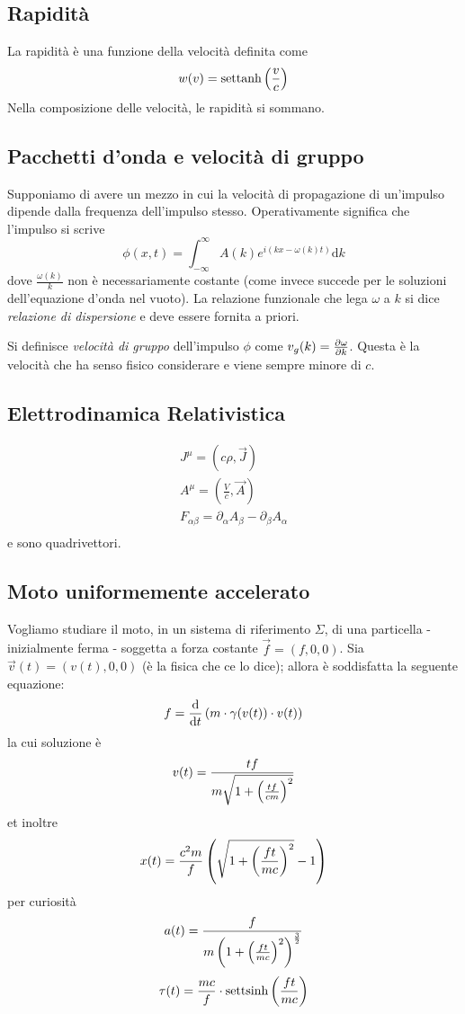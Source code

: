 \documentclass[10pt,a4paper]{article}
\newcommand{\de}{{\ensuremath{ \mbox{d}}}}
\begin{document}
\begin{multicols}{2}
  \subsection*{Rapidità}
  La rapidità è una funzione della velocità definita come
  $$ w(v) = \text{settanh} \left({\frac{v}{c}}\right) $$
  Nella composizione delle velocità, le rapidità si sommano.

  \subsection*{Pacchetti d'onda e velocità di gruppo}
  Supponiamo di avere un mezzo in cui la velocità di propagazione di un'impulso dipende dalla frequenza dell'impulso stesso. Operativamente significa che l'impulso si scrive
  $$ \phi(x, t) = \int_{-\infty}^{\infty} A(k) e^{i(k x - \omega(k) t)} \de k$$
  dove $\frac{\omega(k)}{k}$ non è necessariamente costante (come invece succede per le soluzioni dell'equazione d'onda nel vuoto). La relazione funzionale che lega $\omega$ a $k$ si dice {\it relazione di dispersione} e deve essere fornita a priori.

  Si definisce {\it velocità di gruppo} dell'impulso $\phi$ come $v_g(k) = \frac{\partial {\omega}}{\partial {k}}$. Questa è la velocità che ha senso fisico considerare e viene sempre minore di $c$.

  \subsection*{Elettrodinamica Relativistica}
  \begin{displaymath}
    \begin{array}{c}
      J^\mu = (c\rho, \vec J) \\
      A^\mu = (\frac{V}{c}, \vec A) \\
      F_{\alpha\beta} = \partial_\alpha A_\beta - \partial_\beta A_\alpha \\
    \end{array}
  \end{displaymath}
  e sono quadrivettori.

  \subsection*{Moto uniformemente accelerato}
  Vogliamo studiare il moto, in un sistema di riferimento $\Sigma$, di una particella - inizialmente ferma - soggetta a forza costante $\vec f = (f, 0, 0)$. Sia $\vec v(t) = (v(t), 0, 0)$ (è la fisica che ce lo dice); allora è soddisfatta la seguente equazione:
  $$ f = \ded{}{t} \lrt{m \cdot \gamma(v(t)) \cdot v(t)} $$
  la cui soluzione è
  $$ v(t) = \frac{t f}{m \sqrt{1 + \left({\frac{t f}{cm}}\right)^2}} $$
  et inoltre
  $$ x(t) = \frac{c^2 m}{f} \left({\sqrt{1 + \left({\frac{ft}{mc}}\right)^2} - 1}\right) $$
  per curiosità
  $$ a(t) = \frac{f}{m \left({1 + \left({\frac{ft}{mc}}\right)^2}\right)^{\frac{3}{2}}} $$
  $$ \tau(t) = \frac{mc}{f} \cdot \text{settsinh}\left({\frac{ft}{mc}}\right) $$


\end{multicols}
\end{document}
